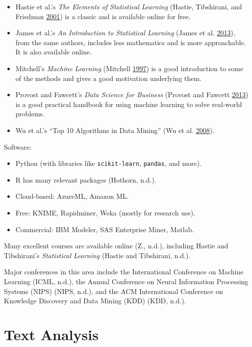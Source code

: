 \documentclass[]{krantz}
\begin{document}
\begin{itemize}
\item
  Hastie et al.'s \emph{The Elements of Statistical Learning} (Hastie,
  Tibshirani, and Friedman
  \protect\hyperlink{ref-HastieTibshirani}{2001}) is a classic and is
  available online for free.
\item
  James et al.'s \emph{An Introduction to Statistical Learning} (James
  et al. \protect\hyperlink{ref-james2013introduction}{2013}), from the
  same authors, includes less mathematics and is more approachable. It
  is also available online.
\item
  Mitchell's \emph{Machine Learning} (Mitchell
  \protect\hyperlink{ref-mitchell1997machine}{1997}) is a good
  introduction to some of the methods and gives a good motivation
  underlying them.
\item
  Provost and Fawcett's \emph{Data Science for Business} (Provost and
  Fawcett \protect\hyperlink{ref-FawcettProvost}{2013}) is a good
  practical handbook for using machine learning to solve real-world
  problems.
\item
  Wu et al.'s ``Top 10 Algorithms in Data Mining'' (Wu et al.
  \protect\hyperlink{ref-wu2008top}{2008}).
\end{itemize}

Software:

\begin{itemize}
\item
  Python (with libraries like \texttt{scikit-learn}, \texttt{pandas},
  and more).
\item
  R has many relevant packages (Hothorn, n.d.).
\item
  Cloud-based: AzureML, Amazon ML.
\item
  Free: KNIME, Rapidminer, Weka (mostly for research use).
\item
  Commercial: IBM Modeler, SAS Enterprise Miner, Matlab.
\end{itemize}

Many excellent courses are available online (Z., n.d.), including Hastie
and Tibshirani's \emph{Statistical Learning} (Hastie and Tibshirani,
n.d.).

Major conferences in this area include the International Conference on
Machine Learning (ICML, n.d.), the Annual Conference on Neural
Information Processing Systems (NIPS) (NIPS, n.d.), and the ACM
International Conference on Knowledge Discovery and Data Mining (KDD)
(KDD, n.d.).

\hypertarget{chap:text}{\chapter{Text Analysis}\label{chap:text}}
\end{document}
